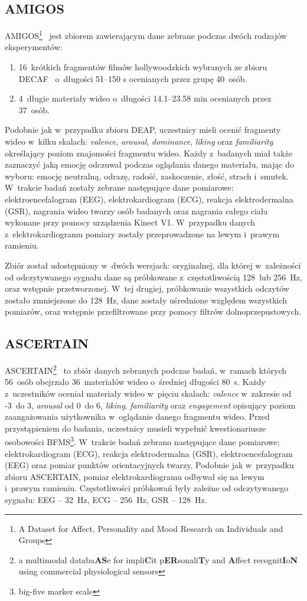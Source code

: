 \subsection{AMIGOS}
AMIGOS\footnote{A Dataset for Affect, Personality and Mood Research on Individuals and Groups}~\cite{amigos_dataset_2017} jest zbiorem zawierającym dane zebrane podczas dwóch rodzajów eksperymentów:
\begin{enumerate}
	\item 16~krótkich fragmentów filmów hollywoodzkich wybranych ze zbioru DECAF~\cite{decaf_dataset_2015} o~długości 51--150 s ocenianych przez grupę 40~osób.
	\item 4~długie materiały wideo o~długości 14.1--23.58 min ocenianych przez 37~osób.
\end{enumerate}
Podobnie jak w~przypadku zbioru DEAP, uczestnicy mieli ocenić fragmenty wideo w~kilku skalach: \textit{valence}, \textit{arousal}, \textit{dominance}, \textit{liking} oraz \textit{familiarity} określający poziom znajomości fragmentu wideo. Każdy z~badanych miał także zaznaczyć jaką emocję odczuwał podczas oglądania danego materiału, mając do wyboru: emocję neutralną, odrazę, radość, zaskoczenie, złość, strach i~smutek. W~trakcie badań zostały zebrane następujące dane pomiarowe: elektroencefalogram (EEG), elektrokardiogram (ECG), reakcja elektrodermalna (GSR), nagrania wideo twarzy osób badanych oraz nagrania całego ciała wykonane przy pomocy urządzenia Kinect V1. W~przypadku danych z~elektrokardiogramu pomiary zostały przeprowadzone na lewym i~prawym ramieniu.

Zbiór został udostępniony w~dwóch wersjach: oryginalnej, dla której w~zależności od odczytywanego sygnału dane są próbkowane z~częstotliwością 128~lub 256~Hz, oraz wstępnie przetworzonej. W~tej drugiej, próbkowanie wszystkich odczytów zostało zmniejszone do 128~Hz, dane zostały uśrednione względem wszystkich pomiarów, oraz wstępnie przefiltrowane przy pomocy filtrów dolnoprzepustowych.
\subsection{ASCERTAIN}
ASCERTAIN\footnote{a multimodal databa\textbf{AS}e for impli\textbf{C}it p\textbf{ER}sonali\textbf{T}y and \textbf{A}ffect recognit\textbf{I}o\textbf{N} using commercial physiological sensors}~\cite{ascertain_dataset_2016} to zbiór danych zebranych podczas badań, w~ramach których 56~osób obejrzało 36~materiałów wideo o~średniej długości 80~s. Każdy z~uczestników oceniał materiały wideo w~pięciu skalach: \textit{valence} w~zakresie od -3~do 3, \textit{arousal} od 0~do 6, \textit{liking}, \textit{familiarity} oraz \textit{engagement} opisujący poziom zaangażowania użytkownika w~oglądanie danego fragmentu wideo. Przed przystąpieniem do badania, uczestnicy musieli wypełnić kwestionariusze osobowości BFMS\footnote{big-five marker scale}.  W~trakcie badań zebrano następujące dane pomiarowe: elektrokardiogram (ECG), reakcja elektrodermalna (GSR), elektroencefalogram (EEG) oraz pomiar punktów orientacyjnych twarzy. Podobnie jak w~przypadku zbioru ASCERTAIN, pomiar elektrokardiogramu odbywał się na lewym i~prawym ramieniu. Częstotliwości próbkowań były zależne od odczytywanego sygnału: EEG -- 32~Hz, ECG -- 256~Hz, GSR -- 128~Hz.

